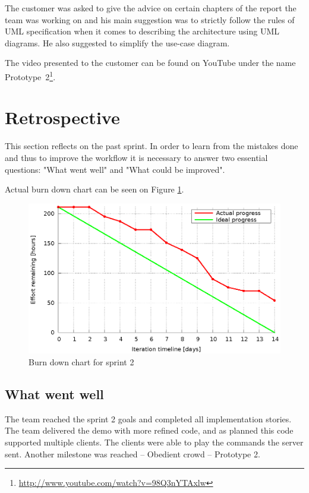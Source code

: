 The customer was asked to give the advice on certain chapters of the report the team was working on and his main suggestion was to strictly follow the rules of UML specification when it comes to describing the architecture using UML diagrams. He also suggested to simplify the use-case diagram.

The video presented to the customer can be found on YouTube under the name Prototype~2\footnote{\url{http://www.youtube.com/watch?v=98Q3nYTAxlw}}.




\section{Retrospective}
This section reflects on the past sprint. In order to learn from the mistakes done and thus to improve the workflow it is necessary to answer two essential questions: "What went well" and "What could be improved".

Actual burn down chart can be seen on Figure \ref{fig:Burn2}.  

\begin{figure}[h]
	\centering
		\includegraphics[width=14cm]{burndowns/sprint2.eps}
	\caption{Burn down chart for sprint 2}
	\label{fig:Burn2}
\end{figure}


\subsection{What went well}
The team reached the sprint 2 goals and completed all implementation stories. 
The team delivered the demo with more refined code, and as planned this code supported multiple clients. 
The clients were able to play the commands the server sent.
Another milestone was reached -- Obedient crowd -- Prototype 2.

